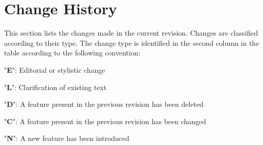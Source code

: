 \documentclass[definition]{../fwprofile}
\begin{document}
\fwmaketitle
\begin{abstract}
This document defines the Framework Profile (or \textit{FW Profile} for short). 
The FW Profile provides the means to model the behaviour of a software application. 
\par
The FW Profile is built on three concepts: (a) State Machines as a means to describe state-dependent functional behaviour; 
(b) Procedures as a means to describe sequential functional behaviour; and (c) RT Containers as a means to describe non-functional behaviour.
\par
The main characteristics of the FW Profile are: (a) Focus on the definition of behaviour independently of software-level design and implementation issues; 
(b) Separate definition of functional and non-functional behaviour; and (c) Support for the definition of the behaviour of reusable software assets 
(\textit{Software Frameworks}).
\end{abstract}
\fwfrontmatter
\newpage

\section{Change History}

This section lists the changes made in the current revision. Changes are classified according to their type. The change type is identified in the second column in the table according to the following convention:

\begin{fw_itemize}
\item "\textbf{E}": Editorial or stylistic change
\item "\textbf{L}": Clarification of existing text
\item "\textbf{D}": A feature present in the previous revision has been deleted
\item "\textbf{C}": A feature present in the previous revision has been changed
\item "\textbf{N}": A new feature has been introduced
\end{fw_itemize}
\end{document}
